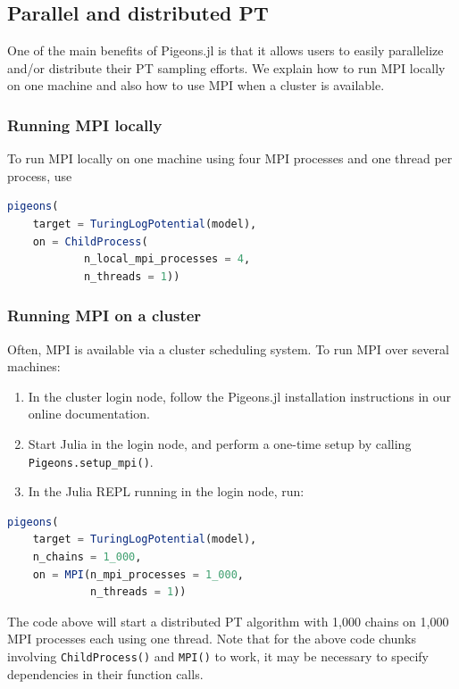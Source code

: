 \subsection{Parallel and distributed PT}
One of the main benefits of Pigeons.jl is that it allows users to easily parallelize 
and/or distribute their PT sampling efforts. We explain how to run MPI locally on 
one machine and also how to use MPI when a cluster is available.

\subsubsection{Running MPI locally}
To run MPI locally on one machine using four MPI processes and one thread per process,
use
\begin{lstlisting}[language = Julia]
pigeons(
    target = TuringLogPotential(model), 
    on = ChildProcess(
            n_local_mpi_processes = 4,
            n_threads = 1))
\end{lstlisting}

\subsubsection{Running MPI on a cluster}
Often, MPI is available via a cluster scheduling system. To run MPI over 
several machines:
\begin{enumerate}
    \item In the cluster login node, follow the Pigeons.jl installation instructions
    in our online documentation. 
    \item Start Julia in the login node, and perform a one-time setup by 
    calling \texttt{Pigeons.setup\_mpi()}.
    \item In the Julia REPL running in the login node, run:
\end{enumerate}
\begin{lstlisting}[language = Julia]
pigeons(
    target = TuringLogPotential(model), 
    n_chains = 1_000,
    on = MPI(n_mpi_processes = 1_000, 
             n_threads = 1))
\end{lstlisting}
The code above will start a distributed PT algorithm with 1,000 chains on 1,000 
MPI processes each using one thread.
Note that for the above code chunks involving \texttt{ChildProcess()} and 
\texttt{MPI()} to work, it may be necessary to specify dependencies in their 
function calls.


